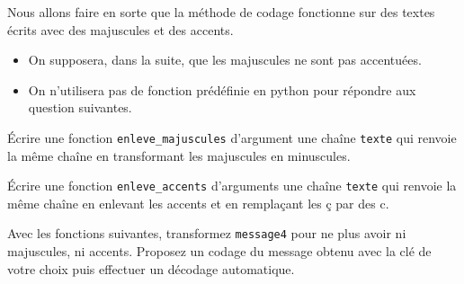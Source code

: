 Nous allons faire en sorte que la méthode de codage fonctionne sur des textes écrits avec des majuscules et des accents.

\begin{remarque}
\begin{itemize}
\item[\textbullet] On supposera, dans la suite, que les majuscules ne sont pas accentuées.
\item[\textbullet] On n'utilisera pas de fonction prédéfinie en python pour répondre aux question suivantes.
\end{itemize}
\end{remarque}

\begin{question}
\'Ecrire une fonction \lstinline{enleve_majuscules} d'argument une chaîne \lstinline{texte} qui renvoie la même chaîne en transformant les majuscules en minuscules.
\end{question}

\begin{question}
\'Ecrire une fonction \lstinline{enleve_accents} d'arguments une chaîne \lstinline{texte}  qui renvoie la même chaîne en enlevant les accents et en remplaçant les ç par des c.
\end{question}

\begin{question}
Avec les fonctions suivantes, transformez \lstinline{message4} pour ne plus avoir ni majuscules, ni accents. Proposez un codage du message obtenu avec la clé de votre choix puis effectuer un décodage automatique.
\end{question}

